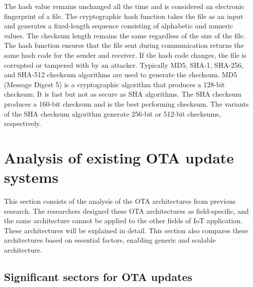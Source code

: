 \documentclass[12pt,a4paper]{article}
\begin{document}
The hash value remains unchanged all the time and is considered an electronic fingerprint of a file. The cryptographic hash function takes the file as an input and generates a fixed-length sequence consisting of alphabetic and numeric values. The checksum length remains the same regardless of the size of the file. The hash function ensures that the file sent during communication returns the same hash code for the sender and receiver. If the hash code changes, the file is corrupted or tampered with by an attacker. Typically MD5, SHA-1, SHA-256, and SHA-512 checksum algorithms are used to generate the checksum. MD5 (Message Digest 5) is a cryptographic algorithm that produces a 128-bit checksum. It is fast but not as secure as SHA algorithms. The SHA checksum produces a 160-bit checksum and is the best performing checksum. The variants of the SHA checksum algorithm generate 256-bit or 512-bit checksums, respectively. \cite{r48}

\newpage

\renewcommand{\baselinestretch}{1.5} %
\section{Analysis of existing OTA update systems}

This section consists of the analysis of the OTA architectures from previous research. The researchers designed these OTA architectures as field-specific, and the same architecture cannot be applied to the other fields of IoT application. These architectures will be explained in detail. This section also compares these architectures based on essential factors, enabling generic and scalable architecture. 

\subsection{Significant sectors for OTA updates}
\end{document}
